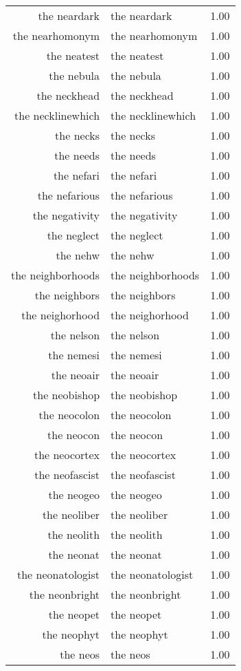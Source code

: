 \begin{table}[ht]
\begin{tabular}{rlr}
  the neardark & the neardark & 1.00 \\ 
  the nearhomonym & the nearhomonym & 1.00 \\ 
  the neatest & the neatest & 1.00 \\ 
  the nebula & the nebula & 1.00 \\ 
  the neckhead & the neckhead & 1.00 \\ 
  the necklinewhich & the necklinewhich & 1.00 \\ 
  the necks & the necks & 1.00 \\ 
  the needs & the needs & 1.00 \\ 
  the nefari & the nefari & 1.00 \\ 
  the nefarious & the nefarious & 1.00 \\ 
  the negativity & the negativity & 1.00 \\ 
  the neglect & the neglect & 1.00 \\ 
  the nehw & the nehw & 1.00 \\ 
  the neighborhoods & the neighborhoods & 1.00 \\ 
  the neighbors & the neighbors & 1.00 \\ 
  the neighorhood & the neighorhood & 1.00 \\ 
  the nelson & the nelson & 1.00 \\ 
  the nemesi & the nemesi & 1.00 \\ 
  the neoair & the neoair & 1.00 \\ 
  the neobishop & the neobishop & 1.00 \\ 
  the neocolon & the neocolon & 1.00 \\ 
  the neocon & the neocon & 1.00 \\ 
  the neocortex & the neocortex & 1.00 \\ 
  the neofascist & the neofascist & 1.00 \\ 
  the neogeo & the neogeo & 1.00 \\ 
  the neoliber & the neoliber & 1.00 \\ 
  the neolith & the neolith & 1.00 \\ 
  the neonat & the neonat & 1.00 \\ 
  the neonatologist & the neonatologist & 1.00 \\ 
  the neonbright & the neonbright & 1.00 \\ 
  the neopet & the neopet & 1.00 \\ 
  the neophyt & the neophyt & 1.00 \\ 
  the neos & the neos & 1.00 \\ 

\end{tabular}
\end{table}
